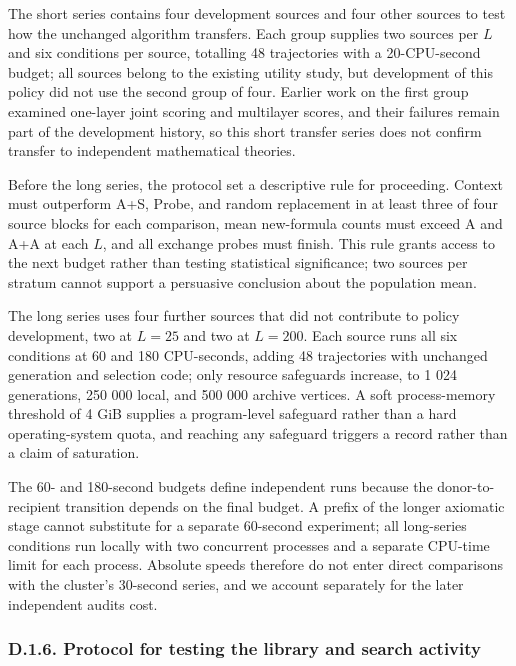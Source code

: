 \documentclass[pdflatex,sn-basic,Numbered]{sn-jnl}
\begin{document}
The short series contains four development sources and four other sources to test how the unchanged algorithm transfers. Each group supplies two sources per \(L\) and six conditions per source, totalling 48 trajectories with a 20-CPU-second budget; all sources belong to the existing utility study, but development of this policy did not use the second group of four. Earlier work on the first group examined one-layer joint scoring and multilayer scores, and their failures remain part of the development history, so this short transfer series does not confirm transfer to independent mathematical theories.

Before the long series, the protocol set a descriptive rule for proceeding. Context must outperform A+S, Probe, and random replacement in at least three of four source blocks for each comparison, mean new-formula counts must exceed A and A+A at each \(L\), and all exchange probes must finish. This rule grants access to the next budget rather than testing statistical significance; two sources per stratum cannot support a persuasive conclusion about the population mean.

The long series uses four further sources that did not contribute to policy development, two at \(L = 25\) and two at \(L = 200\). Each source runs all six conditions at 60 and 180 CPU-seconds, adding 48 trajectories with unchanged generation and selection code; only resource safeguards increase, to 1 024 generations, 250 000 local, and 500 000 archive vertices. A soft process-memory threshold of 4 GiB supplies a program-level safeguard rather than a hard operating-system quota, and reaching any safeguard triggers a record rather than a claim of saturation.

The 60- and 180-second budgets define independent runs because the donor-to-recipient transition depends on the final budget. A prefix of the longer axiomatic stage cannot substitute for a separate 60-second experiment; all long-series conditions run locally with two concurrent processes and a separate CPU-time limit for each process. Absolute speeds therefore do not enter direct comparisons with the cluster's 30-second series, and we account separately for the later independent audit\textquotesingle s cost.

\subsubsection*{D.1.6. Protocol for testing the library and search activity}\label{d.1.6.-protocol-for-testing-the-library-and-search-activity}
\end{document}
